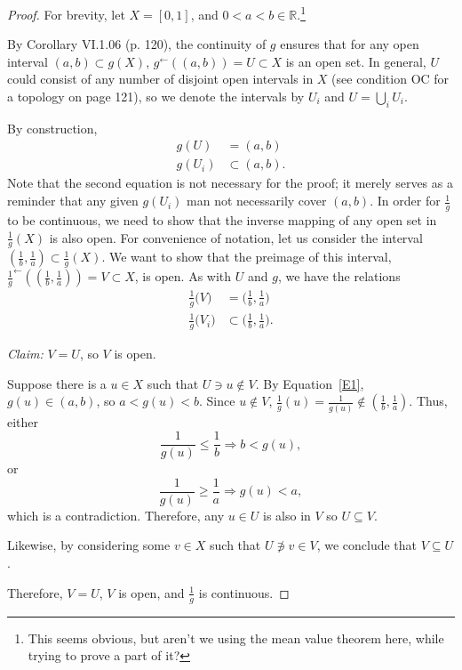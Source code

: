 \documentclass[11pt]{article}
\begin{document}
\begin{proof}
  For brevity, let $X = [0,1]$, and $0 < a < b \in
  \mathbb{R}$.\footnote{This seems obvious, but aren't we using the
  mean value theorem here, while trying to prove a part of it?}
  
  By Corollary VI.1.06 (p. 120), the continuity of $g$ ensures that for
  any open interval $(a,b) \subset g(X)$, $g^{\leftarrow}((a,b)) = U
  \subset X $ is an open set. In general, $U$ could consist of any
  number of disjoint open intervals in $X$ (see condition OC for a
  topology on page 121), so we denote the intervals by $U_i$ and $U =
  \bigcup_i U_i $.

  By construction,
  \begin{align}
    g(U)   &=       (a,b) \label{E1} \\
    g(U_i) &\subset (a,b).
  \end{align}
  Note that the second equation is not necessary for the proof; it
  merely serves as a reminder that any given $g(U_i)$ man not
  necessarily cover $(a,b)$.  In order for $\frac{1}{g}$ to be
  continuous, we need to show that the inverse mapping of any open set
  in $\frac{1}{g}(X) $ is also open.  For convenience of notation, let
  us consider the interval $(\frac{1}{b},\frac{1}{a}) \subset
  \frac{1}{g}(X)$.  We want to show that the preimage of this
  interval, $\frac{1}{g}^{\leftarrow}((\frac{1}{b},\frac{1}{a})) = V
  \subset X $, is open. As with $U$ and $g$, we have the relations
  \begin{align}
    \label{E3}
    \frac{1}{g}\Big(V\Big)   &=       \Big(\frac{1}{b},\frac{1}{a}\Big) \\
    \frac{1}{g}\Big(V_i\Big) &\subset \Big(\frac{1}{b},\frac{1}{a}\Big).
  \end{align}

  \emph{Claim:} $V = U$, so $V$ is open.

  Suppose there is a $u \in X$ such that $U \ni u \notin V$.  By
  Equation~\ref{E1}, $g(u) \in (a,b)$, so $a < g(u) < b$.  Since $u
  \notin V$, $\frac{1}{g}(u) = \frac{1}{g(u)} \notin
  (\frac{1}{b},\frac{1}{a})$.  Thus, either
  \begin{equation}
    \frac{1}{g(u)} \le \frac{1}{b} \Longrightarrow b < g(u),
  \end{equation}
  or
  \begin{equation}
    \frac{1}{g(u)} \ge \frac{1}{a} \Longrightarrow g(u) < a,
  \end{equation}
  which is a contradiction.  Therefore, any $u \in U$ is also in $V$
  so $U \subseteq V$.

  Likewise, by considering some $v \in X$ such that $U \not\owns v \in
  V$, we conclude that $V \subseteq U$.

  Therefore, $V = U$, $V$ is open, and $\frac{1}{g}$ is continuous.
  
\end{proof}
\end{document}
